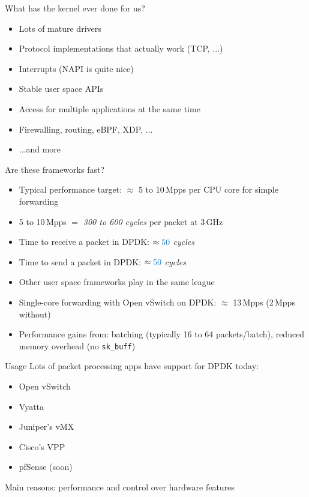 \documentclass[NET,english,aspectratio=169]{tumbeamer}
\begin{document}
\begin{frame}{What has the kernel ever done for us?}
\begin{itemize}
\item<1-> Lots of mature drivers
\item<2-> Protocol implementations that actually work (TCP, ...)
\item<3-> Interrupts (NAPI is quite nice)
\item<3-> Stable user space APIs
\item<3-> Access for multiple applications at the same time
\item<3-> Firewalling, routing, eBPF, XDP, ...
\item<3-> ...and more
\end{itemize}
\end{frame}

\begin{frame}{Are these frameworks fast?}
\begin{itemize}
\item<1-> Typical performance target: $\approx$ 5 to 10\,Mpps per CPU core for simple forwarding
\item<1-> 5 to 10\,Mpps $=$ \emph{300 to 600 cycles} per packet at 3\,GHz
\vspace{1em}
\item<2-> Time to receive a packet in DPDK: $\approx \emph{50}$ \emph{cycles}
\item<2-> Time to send a packet in DPDK: $\approx \emph{50}$ \emph{cycles}
\item<2-> Other user space frameworks play in the same league
\vspace{1em}
\item<2-> Single-core forwarding with Open vSwitch on DPDK: $\approx$ 13\,Mpps (2\,Mpps without)
\item<2-> Performance gains from: batching (typically 16 to 64 packets/batch), reduced memory overhead (no \texttt{sk\_buff})
\end{itemize}
\end{frame}

\begin{frame}{Usage}
Lots of packet processing apps have support for DPDK today:
\begin{itemize}
\item Open vSwitch
\item Vyatta
\item Juniper's vMX
\item Cisco's VPP
\item pfSense (soon)
\end{itemize}
Main reasons: performance and control over hardware features
\end{frame}
\end{document}
